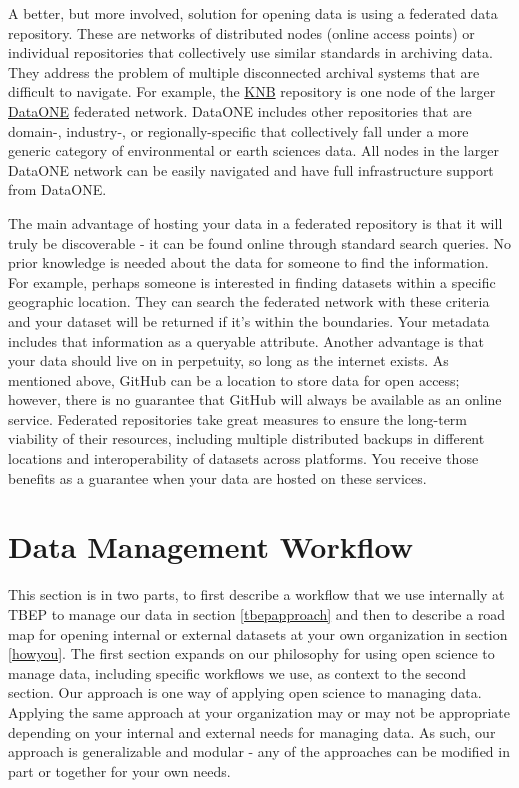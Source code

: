 \documentclass[
]{book}
\begin{document}
A better, but more involved, solution for opening data is using a federated data repository. These are networks of distributed nodes (online access points) or individual repositories that collectively use similar standards in archiving data. They address the problem of multiple disconnected archival systems that are difficult to navigate. For example, the \href{https://knb.ecoinformatics.org/}{KNB} repository is one node of the larger \href{https://www.dataone.org/}{DataONE} federated network. DataONE includes other repositories that are domain-, industry-, or regionally-specific that collectively fall under a more generic category of environmental or earth sciences data. All nodes in the larger DataONE network can be easily navigated and have full infrastructure support from DataONE.

The main advantage of hosting your data in a federated repository is that it will truly be discoverable - it can be found online through standard search queries. No prior knowledge is needed about the data for someone to find the information. For example, perhaps someone is interested in finding datasets within a specific geographic location. They can search the federated network with these criteria and your dataset will be returned if it's within the boundaries. Your metadata includes that information as a queryable attribute. Another advantage is that your data should live on in perpetuity, so long as the internet exists. As mentioned above, GitHub can be a location to store data for open access; however, there is no guarantee that GitHub will always be available as an online service. Federated repositories take great measures to ensure the long-term viability of their resources, including multiple distributed backups in different locations and interoperability of datasets across platforms. You receive those benefits as a guarantee when your data are hosted on these services.

\chapter{Data Management Workflow}\label{workflow}

This section is in two parts, to first describe a workflow that we use internally at TBEP to manage our data in section \ref{tbepapproach} and then to describe a road map for opening internal or external datasets at your own organization in section \ref{howyou}. The first section expands on our philosophy for using open science to manage data, including specific workflows we use, as context to the second section. Our approach is one way of applying open science to managing data. Applying the same approach at your organization may or may not be appropriate depending on your internal and external needs for managing data. As such, our approach is generalizable and modular - any of the approaches can be modified in part or together for your own needs.
\end{document}
